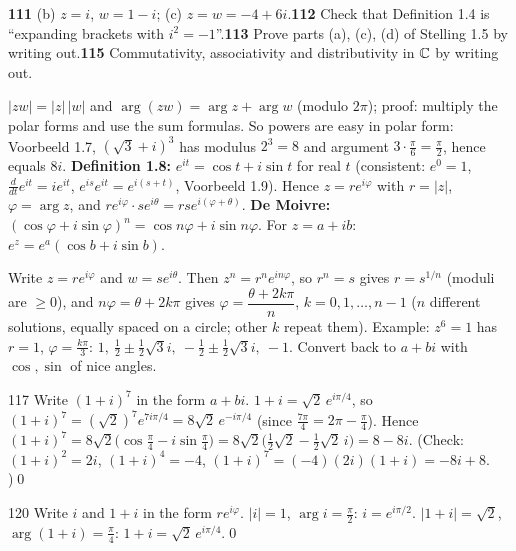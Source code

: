 \begin{trybox}[{111(b),(c), 112, 113, 115}]
\textbf{111} (b) $z=i$, $w=1-i$; (c) $z=w=-4+6i$.\quad \textbf{112} Check that Definition 1.4 is ``expanding brackets with $i^2=-1$''.\quad \textbf{113} Prove parts (a), (c), (d) of Stelling 1.5 by writing out.\quad \textbf{115} Commutativity, associativity and distributivity in $\mathbb{C}$ by writing out.
\end{trybox}

\begin{result}
$|zw|=|z|\,|w|$ and $\arg(zw)=\arg z+\arg w$ (modulo $2\pi$); proof: multiply the polar forms and use the sum formulas. So powers are easy in polar form: Voorbeeld 1.7, $(\sqrt3+i)^3$ has modulus $2^3=8$ and argument $3\cdot\frac\pi6=\frac\pi2$, hence equals $8i$. \textbf{Definition 1.8:} $e^{it}=\cos t+i\sin t$ for real $t$ (consistent: $e^{0}=1$, $\frac d{dt}e^{it}=ie^{it}$, $e^{is}e^{it}=e^{i(s+t)}$, Voorbeeld 1.9). Hence $z=re^{i\varphi}$ with $r=|z|$, $\varphi=\arg z$, and $re^{i\varphi}\cdot se^{i\theta}=rse^{i(\varphi+\theta)}$. \textbf{De Moivre:} $(\cos\varphi+i\sin\varphi)^n=\cos n\varphi+i\sin n\varphi$. For $z=a+ib$: $e^z=e^a(\cos b+i\sin b)$.
\end{result}
\begin{strategy}[{Voorbeeld 1.10 \textperiodcentered\ solving $z^n=w$}]
Write $z=re^{i\varphi}$ and $w=se^{i\theta}$. Then $z^n=r^ne^{in\varphi}$, so $r^n=s$ gives $r=s^{1/n}$ (moduli are $\ge0$), and $n\varphi=\theta+2k\pi$ gives $\varphi=\dfrac{\theta+2k\pi}n$, $k=0,1,\dots,n-1$ ($n$ different solutions, equally spaced on a circle; other $k$ repeat them). Example: $z^6=1$ has $r=1$, $\varphi=\frac{k\pi}3$: $1,\ \frac12\pm\frac12\sqrt3i,\ -\frac12\pm\frac12\sqrt3i,\ -1$. Convert back to $a+bi$ with $\cos,\sin$ of nice angles.
\end{strategy}

\begin{bookex}{117}
Write $(1+i)^7$ in the form $a+bi$.
\solution
$1+i=\sqrt2\,e^{i\pi/4}$, so $(1+i)^7=(\sqrt2)^7e^{7i\pi/4}=8\sqrt2\,e^{-i\pi/4}$ (since $\frac{7\pi}4=2\pi-\frac\pi4$). Hence $(1+i)^7=8\sqrt2\big(\cos\tfrac\pi4-i\sin\tfrac\pi4\big)=8\sqrt2\big(\tfrac12\sqrt2-\tfrac12\sqrt2\,i\big)=8-8i$. (Check: $(1+i)^2=2i$, $(1+i)^4=-4$, $(1+i)^7=(-4)(2i)(1+i)=-8i+8$. \checkmark)\qed
\end{bookex}

\begin{bookex}{120}
Write $i$ and $1+i$ in the form $re^{i\varphi}$.
\solution
$|i|=1$, $\arg i=\frac\pi2$: $i=e^{i\pi/2}$. $|1+i|=\sqrt2$, $\arg(1+i)=\frac\pi4$: $1+i=\sqrt2\,e^{i\pi/4}$.\qed
\end{bookex}

